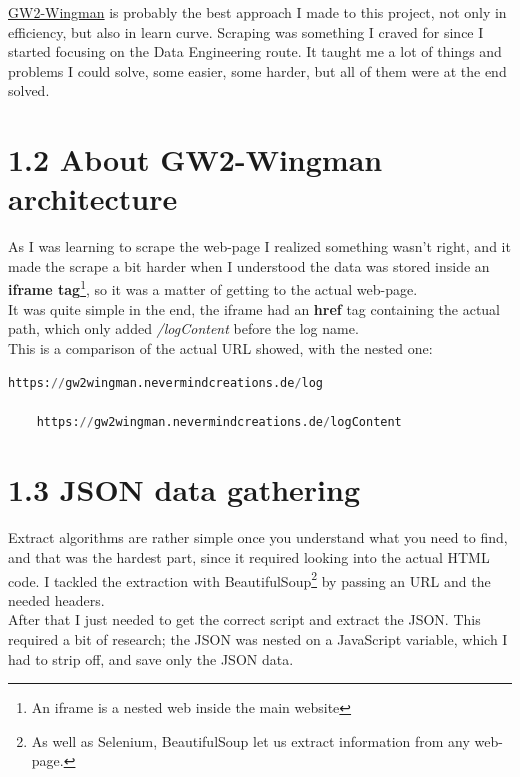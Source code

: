\documentclass[12pt,a4paper]{article}
\begin{document}
    \noindent \href{https://gw2wingman.nevermindcreations.de/home}{GW2-Wingman} is probably the best approach I made to this project, not only in efficiency, but also
    in learn curve. Scraping was something I craved for since I started focusing on the Data Engineering
    route. It taught me a lot of things and problems I could solve, some easier, some harder, but
    all of them were at the end solved.

    \newpage

    \section*{\large 1.2 About GW2-Wingman architecture}
    As I was learning to scrape the web-page I realized something wasn't right, and it made the scrape a
    bit harder when I understood the data was stored inside an \textbf{iframe tag}\footnote{An iframe is a nested web
    inside the main website}, so it was a matter of getting to the actual web-page.\\

    \noindent It was quite simple in the end, the iframe had an \textbf{href} tag containing the actual path, which only added
    \textit{/logContent} before the log name. \\

    \noindent This is a comparison of the actual URL showed, with the nested one:
    \begin{lstlisting}[language=Python]
    https://gw2wingman.nevermindcreations.de/log

    https://gw2wingman.nevermindcreations.de/logContent
    \end{lstlisting}

    \section*{\large 1.3 JSON data gathering}
    Extract algorithms are rather simple once you understand what you need to find, and that was
    the hardest part, since it required looking into the actual HTML code. I tackled the extraction
    with BeautifulSoup\footnote{As well as Selenium, BeautifulSoup let us extract information from any web-page.} 
    by passing an URL and the needed headers.\\

    \noindent After that I just needed to get the correct script and extract the JSON. This required a bit of 
    research; the JSON was nested on a JavaScript variable, which I had to strip off, and save only the
    JSON data.
\end{document}
